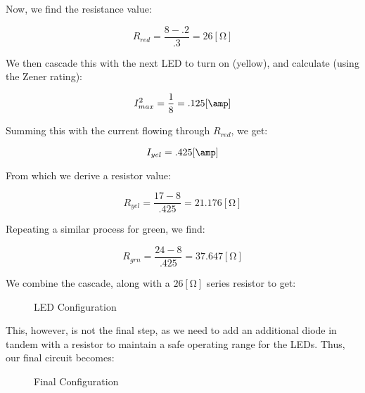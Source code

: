 \begin{enumerate}
    Now, we find the resistance value:

    $$R_{red}=\frac{8-.2}{.3}=26[\si{\ohm}]$$

    We then cascade this with the next LED to turn on (yellow), and calculate (using the Zener rating):

    $$I_{max}^2=\frac{1}{8}=.125[\si{\amp}]$$

    Summing this with the current flowing through $R_{red}$, we get:

    $$I_{yel}=.425[\si{\amp}]$$

    From which we derive a resistor value:

    $$R_{yel}=\frac{17-8}{.425}=21.176[\si{\ohm}]$$

    Repeating a similar process for green, we find:

    $$R_{grn}=\frac{24-8}{.425}=37.647[\si{\ohm}]$$

    We combine the cascade, along with a $26[\si{\ohm}]$ series resistor to get:

    \begin{figure}[H]
      \centering
      
      \caption{LED Configuration}
      \label{fig:1}
    \end{figure}

    This, however, is not the final step, as we need to add an additional diode in tandem with a resistor to maintain a safe operating range for the LEDs. Thus, our final circuit becomes:

    \begin{figure}[H]
      \centering
      
      \caption{Final Configuration}
      \label{fig:2}
    \end{figure}

\end{enumerate}



